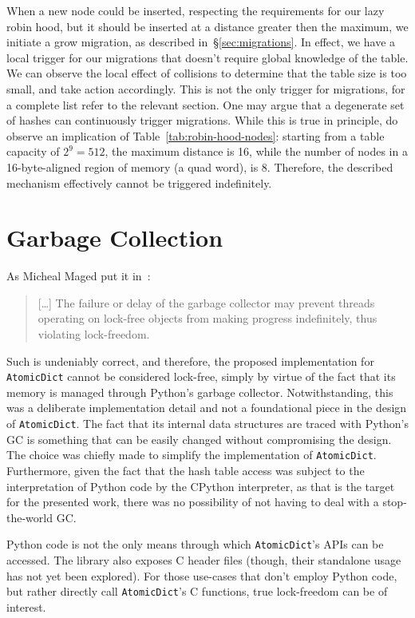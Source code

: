 When a new node could be inserted, respecting the requirements for our lazy robin hood, but it should be inserted at a distance greater then the maximum, we initiate a grow migration, as described in~\S\ref{sec:migrations}.
In effect, we have a local trigger for our migrations that doesn't require global knowledge of the table.
We can observe the local effect of collisions to determine that the table size is too small, and take action accordingly.
This is not the only trigger for migrations, for a complete list refer to the relevant section.
One may argue that a degenerate set of hashes can continuously trigger migrations.
While this is true in principle, do observe an implication of Table~\ref{tab:robin-hood-nodes}: starting from a table capacity of $2^9 = 512$, the maximum distance is 16, while the number of nodes in a 16-byte-aligned region of memory (a quad word), is 8.
Therefore, the described mechanism effectively cannot be triggered indefinitely.


\section{Garbage Collection}\label{sec:garbage-collection}

As Micheal Maged put it in~\cite[\S2.3]{micheal-hash-tables}:
\begin{quote}
	[\ldots] The failure or delay of the garbage collector may prevent threads operating on lock-free objects from making progress indefinitely, thus violating lock-freedom.
\end{quote}

Such is undeniably correct, and therefore, the proposed implementation for \texttt{AtomicDict} cannot be considered lock-free, simply by virtue of the fact that its memory is managed through Python's garbage collector.
Notwithstanding, this was a deliberate implementation detail and not a foundational piece in the design of \texttt{AtomicDict}.
The fact that its internal data structures are traced with Python's GC is something that can be easily changed without compromising the design.
The choice was chiefly made to simplify the implementation of \texttt{AtomicDict}.
Furthermore, given the fact that the hash table access was subject to the interpretation of Python code by the CPython interpreter, as that is the target for the presented work, there was no possibility of not having to deal with a stop-the-world GC\@.

Python code is not the only means through which \texttt{AtomicDict}'s APIs can be accessed.
The library also exposes C header files (though, their standalone usage has not yet been explored).
For those use-cases that don't employ Python code, but rather directly call \texttt{AtomicDict}'s C functions, true lock-freedom can be of interest.

